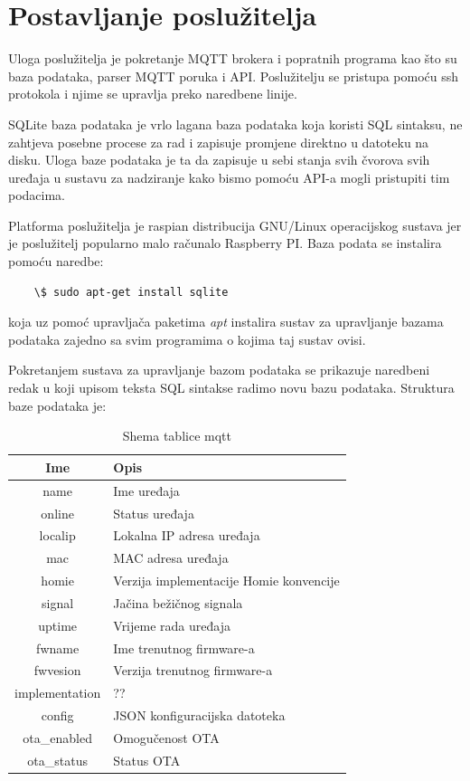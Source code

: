 \documentclass[times, utf8, zavrsni]{fer}
\begin{document}
\section{Postavljanje poslužitelja}
Uloga poslužitelja je pokretanje MQTT brokera i popratnih programa kao što su baza podataka, parser MQTT poruka i API.
Poslužitelju se pristupa pomoću ssh protokola i njime se upravlja preko naredbene linije.

SQLite baza podataka je vrlo lagana baza podataka koja koristi SQL sintaksu, ne zahtjeva posebne procese za rad i zapisuje promjene direktno u datoteku na disku.
Uloga baze podataka je ta da zapisuje u sebi stanja svih čvorova svih uređaja u sustavu za nadziranje kako bismo pomoću API-a mogli pristupiti tim podacima.

Platforma poslužitelja je raspian distribucija GNU/Linux operacijskog sustava jer je poslužitelj popularno malo računalo Raspberry PI.
Baza podata se instalira pomoću naredbe:
\begin{lstlisting}
    \$ sudo apt-get install sqlite
\end{lstlisting}
koja uz pomoć upravljača paketima \textit{apt} instalira sustav za upravljanje bazama podataka zajedno sa svim programima o kojima taj sustav ovisi.

Pokretanjem sustava za upravljanje bazom podataka se prikazuje naredbeni redak u koji upisom teksta SQL sintakse radimo novu
bazu podataka.
Struktura baze podataka je:
\begin{table}[h]
    \begin{tabular}{ |c|l| }
        \hline
        Ime & Opis \\
        \hline
        name & Ime uređaja\\
        \hline
        online & Status uređaja\\
        \hline
        localip & Lokalna IP adresa uređaja\\
        \hline
        mac & MAC adresa uređaja\\
        \hline
        homie & Verzija implementacije Homie konvencije\\
        \hline
        signal & Jačina bežičnog signala\\
        \hline
        uptime & Vrijeme rada uređaja\\
        \hline
        fwname & Ime trenutnog firmware-a\\
        \hline
        fwvesion & Verzija trenutnog firmware-a\\
        \hline
        implementation & ??\\
        \hline
        config & JSON konfiguracijska datoteka\\
        \hline
        ota\_enabled & Omogučenost OTA\\
        \hline
        ota\_status & Status OTA\\
        \hline
    \end{tabular}
    \caption{Shema tablice mqtt}
\end{table}
\end{document}
